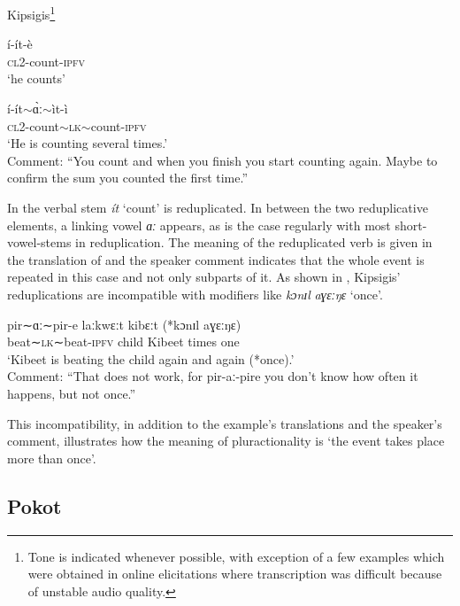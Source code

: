 \documentclass[output=paper,colorlinks,citecolor=brown
]{langscibook}
\begin{document}
\ea Kipsigis\footnote{Tone is indicated whenever possible, with exception of a few examples which were obtained in online elicitations where transcription was difficult because of unstable audio quality.} \label{ex:fiebig:firstKip}
\begin{xlist}

\ex \label{ex:fiebig:firstKipA}
\gll í-ít-è\\
\textsc{cl2}-count-\textsc{ipfv}\\
\glt `he counts'

\ex \label{ex:fiebig:firstKipB}
\gll í-ít$\sim$ɑ̀ː$\sim$ìt-ì \\
\textsc{cl2}-count$\sim$\textsc{lk}$\sim$count-\textsc{ipfv}\\
\glt `He is counting several times.'\\ Comment: ``You count and when you finish you start counting again. Maybe to confirm the sum you counted the first time.''

\end{xlist}

\z 


\noindent In  the verbal stem \textit{ít} `count' is reduplicated. In between the two reduplicative elements, a linking vowel \textit{ɑː} appears, as is the case regularly with most short-vowel-stems in reduplication.
The meaning of the reduplicated verb is given in the translation of  and the speaker comment indicates that the whole event is repeated in this case and not only subparts of it. As shown in , Kipsigis' reduplications are incompatible with modifiers like \textit{kɔnɪl} \textsl{a}\textit{ɣɛːŋɛ} `once'.

\ea \label{ex:fiebig:first}
\gll pir∼ɑː∼pir-e laːkwɛːt kibɛːt (*kɔnɪl aɣɛːŋɛ)\\
beat∼\textsc{lk}∼beat-\textsc{ipfv} child Kibeet times one\\
\glt `Kibeet is beating the child again and again (*once).'\\ 
Comment: ``That does not work, for pir-aː-pire you don't know how often it happens, but not once.''
\z

\noindent This incompatibility, in addition to the example's translations and the speaker's comment, illustrates how the meaning of pluractionality is `the event takes place more than once'.





\subsection{Pokot}
\end{document}
